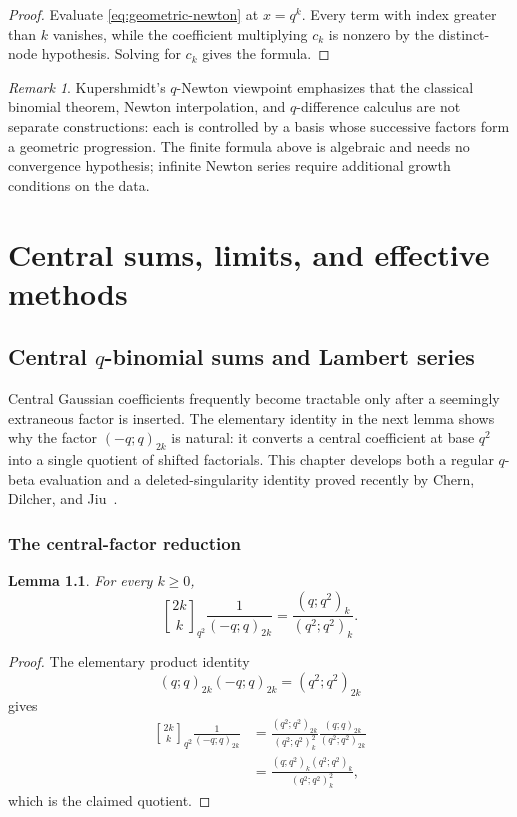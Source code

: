 \documentclass[11pt,oneside,openany]{book}
\newtheorem{lemma}[theorem]{Lemma}
\theoremstyle{definition}
\theoremstyle{remark}
\newtheorem{remark}[theorem]{Remark}
\newcommand{\Qbinom}[3]{\genfrac{[}{]}{0pt}{}{#1}{#2}_{#3}}
\begin{document}
\begin{proof}
Evaluate \eqref{eq:geometric-newton} at $x=q^k$.  Every term with index greater than $k$ vanishes, while the coefficient multiplying $c_k$ is nonzero by the distinct-node hypothesis.  Solving for $c_k$ gives the formula.
\end{proof}

\begin{remark}
Kupershmidt's $q$-Newton viewpoint emphasizes that the classical binomial theorem, Newton interpolation, and $q$-difference calculus are not separate constructions: each is controlled by a basis whose successive factors form a geometric progression.  The finite formula above is algebraic and needs no convergence hypothesis; infinite Newton series require additional growth conditions on the data.
\end{remark}

\part{Central sums, limits, and effective methods}

\chapter{Central \texorpdfstring{$q$}{q}-binomial sums and Lambert series}\label{chap:central}

Central Gaussian coefficients frequently become tractable only after a seemingly extraneous factor is inserted.  The elementary identity in the next lemma shows why the factor $(-q;q)_{2k}$ is natural: it converts a central coefficient at base $q^2$ into a single quotient of shifted factorials.  This chapter develops both a regular $q$-beta evaluation and a deleted-singularity identity proved recently by Chern, Dilcher, and Jiu~\cite{ChernDilcherJiu2026}.

\section{The central-factor reduction}

\begin{lemma}\label{lem:central-reduction}
For every $k\ge0$,
\[
 \Qbinom{2k}{k}{q^2}\frac1{(-q;q)_{2k}}
 =\frac{(q;q^2)_k}{(q^2;q^2)_k}.
 \tag{18.1}\label{eq:central-reduction}
\]
\end{lemma}

\begin{proof}
The elementary product identity
\[
 (q;q)_{2k}(-q;q)_{2k}=(q^2;q^2)_{2k}
\]
gives
\begin{align*}
 \Qbinom{2k}{k}{q^2}\frac1{(-q;q)_{2k}}
 &=\frac{(q^2;q^2)_{2k}}{(q^2;q^2)_k^2}
   \frac{(q;q)_{2k}}{(q^2;q^2)_{2k}}\\
 &=\frac{(q;q^2)_k(q^2;q^2)_k}{(q^2;q^2)_k^2},
\end{align*}
which is the claimed quotient.
\end{proof}
\end{document}
